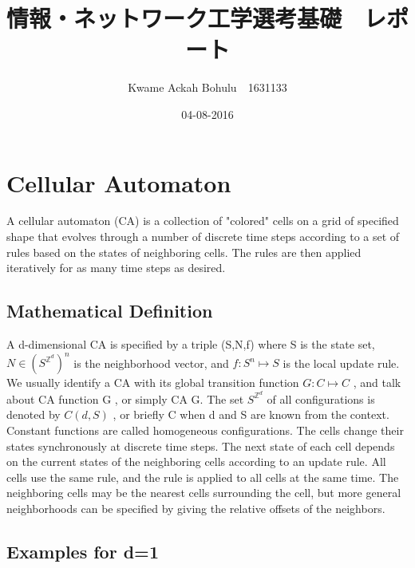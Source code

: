 \documentclass[24 pts]{article}
\title{情報・ネットワーク工学選考基礎　レポート }
\date{04-08-2016}
\author{Kwame Ackah Bohulu　1631133}
\begin{document}
\maketitle
\section{Cellular Automaton}
A cellular automaton (CA) is a collection of "colored" cells on a grid of specified shape that evolves through a number of discrete time steps according to a set of rules based on the states of neighboring cells. The rules are then applied iteratively for as many time steps as desired.
\subsection{Mathematical Definition}

 A
d-dimensional CA is specified by a triple
(S,N,f)
where
S is the state set,
$N\in(S^{\mathbb{Z}^d})^n$
is the neighborhood vector, and
$f:S^n\mapsto S$
is the local update rule. We usually identify a CA with its global transition function
$G:C\mapsto C$
, and
talk about CA function
G
, or simply CA
G.
The set $S^{\mathbb{Z}^d}$ of all configurations is denoted by
$C
(d,S)$
, or briefly C
when
d
and
S
are known
from the context. Constant functions are called
homogeneous
configurations.
The cells change their states synchronously at discrete time steps. The next state of each
cell depends on the current states of the neighboring cells according to an update rule. All
cells use the same rule, and the rule is applied to all cells at the same time. The neighboring cells may be the nearest cells surrounding the cell, but more general neighborhoods can
be specified by giving the relative offsets of the neighbors.
\subsection{Examples for d=1}
\end{document}
